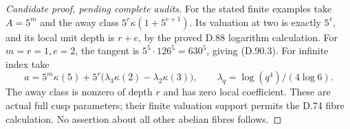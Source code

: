 \begin{proof}[Candidate proof, pending complete audits]
For the stated finite examples take \(A=5^m\) and the
away class \(5^r\kappa(1+5^{e+1})\). Its valuation at
two is exactly \(5^r\), and its local unit depth is
\(r+e\), by the proved D.88 logarithm calculation.
For \(m=r=1,e=2\), the tangent is
\(5^5\cdot126^5=630^5\), giving (D.90.3).
For infinite index take
\[
 a=5^m\kappa(5)+
    5^r\bigl(\lambda_3\kappa(2)-\lambda_2\kappa(3)\bigr),
 \qquad \lambda_q=\log(q^4)/(4\log6).
\]
The away class is nonzero of depth \(r\) and has zero
local coefficient. These are actual full cusp parameters;
their finite valuation support permits the D.74 fibre
calculation. No assertion about all other abelian fibres follows.
\end{proof}
